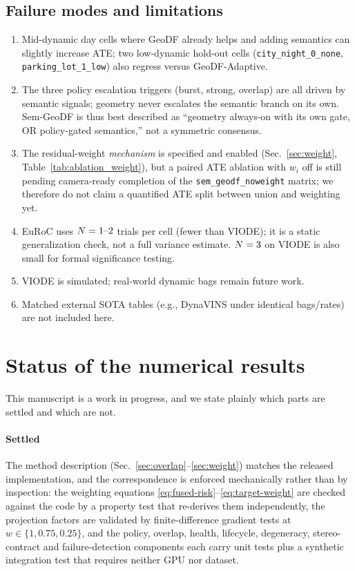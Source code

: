 \documentclass{ieeeaccess}
\begin{document}
\subsection{Failure modes and limitations}
\begin{enumerate}
\item Mid-dynamic day cells where GeoDF already helps and adding semantics can slightly increase ATE; two low-dynamic hold-out cells (\texttt{city\_night\_0\_none}, \texttt{parking\_lot\_1\_low}) also regress versus GeoDF-Adaptive.
\item The three policy escalation triggers (burst, strong, overlap) are all driven by semantic signals; geometry never escalates the semantic branch on its own. Sem-GeoDF is thus best described as ``geometry always-on with its own gate, OR policy-gated semantics,'' not a symmetric consensus.
\item The residual-weight \emph{mechanism} is specified and enabled (Sec.~\ref{sec:weight}, Table~\ref{tab:ablation_weight}), but a paired ATE ablation with \(w_i\) off is still pending camera-ready completion of the \texttt{sem\_geodf\_noweight} matrix; we therefore do not claim a quantified ATE split between union and weighting yet.
\item EuRoC uses \(N=\mbox{1--2}\) trials per cell (fewer than VIODE); it is a static generalization check, not a full variance estimate. \(N=3\) on VIODE is also small for formal significance testing.
\item VIODE is simulated; real-world dynamic bags remain future work.
\item Matched external SOTA tables (e.g., DynaVINS under identical bags/rates) are not included here.
\end{enumerate}

\section{Status of the numerical results}
\label{sec:status}
This manuscript is a work in progress, and we state plainly which parts are settled and which are not.

\paragraph{Settled}
The method description (Sec.~\ref{sec:overlap}--\ref{sec:weight}) matches the released implementation, and the correspondence is enforced mechanically rather than by inspection: the weighting equations \eqref{eq:fused-risk}--\eqref{eq:target-weight} are checked against the code by a property test that re-derives them independently, the projection factors are validated by finite-difference gradient tests at \(w\in\{1,0.75,0.25\}\), and the policy, overlap, health, lifecycle, degeneracy, stereo-contract and failure-detection components each carry unit tests plus a synthetic integration test that requires neither GPU nor dataset.
\end{document}

